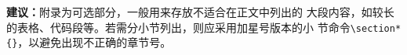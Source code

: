 \begin{appendices}
	\begin{leftbar}
		\noindent\textbf{建议：}附录为可选部分，一般用来存放不适合在正文中列出的
		大段内容，如较长的表格、代码段等。若需分小节列出，则应采用加星号版本的小
		节命令\verb|\section*{}|，以避免出现不正确的章节号。
	\end{leftbar}

\end{appendices}